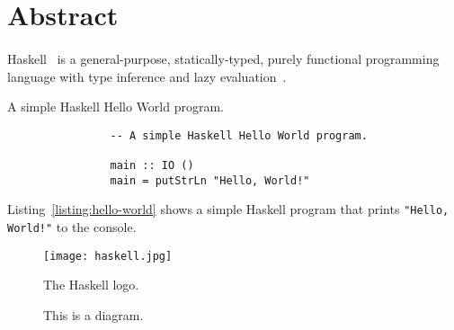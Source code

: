 \documentclass[main.tex]{subfiles}
\begin{document}
\section*{Abstract}
    \paragraph{}
        Haskell~\cite{haskell} is a general-purpose, statically-typed, purely
            functional programming language with type inference and lazy
            evaluation~\cite{wiki-haskell}.

        \begin{listing}[H]
            \caption{A simple Haskell Hello World program.}
            \begin{verbatim}
                -- A simple Haskell Hello World program.
                
                main :: IO ()
                main = putStrLn "Hello, World!"
            \end{verbatim}
            \label{listing:hello-world}
        \end{listing}

        Listing~\ref{listing:hello-world} shows a simple Haskell program that prints
            \verb|"Hello, World!"| to the console.

        \begin{figure}[H]
            \centering
            \texttt{[image: haskell.jpg]}
            \caption{The Haskell logo.}
            \label{fig:haskell-logo}
        \end{figure}

        \begin{figure}[H]
            \centering
            \caption{This is a diagram.}
            \label{fig:diagram}
        \end{figure}
\end{document}
